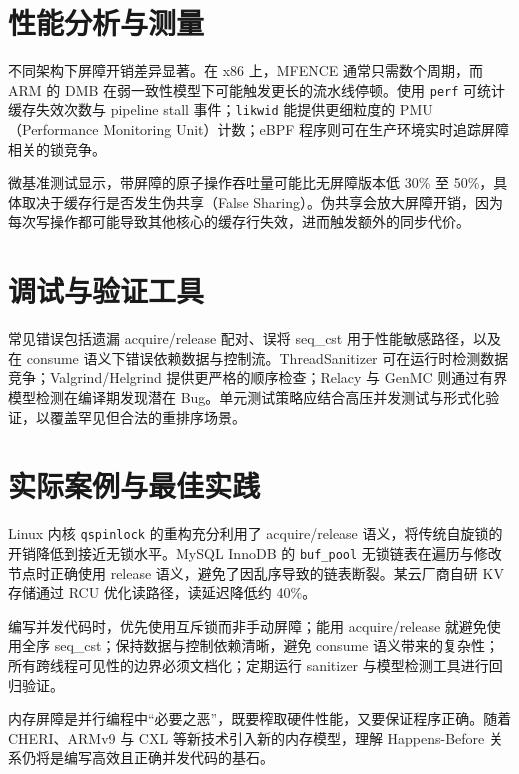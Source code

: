 \chapter{性能分析与测量}
不同架构下屏障开销差异显著。在 x86 上，MFENCE 通常只需数个周期，而 ARM 的 DMB 在弱一致性模型下可能触发更长的流水线停顿。使用 \texttt{perf} 可统计缓存失效次数与 pipeline stall 事件；\texttt{likwid} 能提供更细粒度的 PMU（Performance Monitoring Unit）计数；eBPF 程序则可在生产环境实时追踪屏障相关的锁竞争。\par
微基准测试显示，带屏障的原子操作吞吐量可能比无屏障版本低 30\%{} 至 50\%{}，具体取决于缓存行是否发生伪共享（False Sharing）。伪共享会放大屏障开销，因为每次写操作都可能导致其他核心的缓存行失效，进而触发额外的同步代价。\par
\chapter{调试与验证工具}
常见错误包括遗漏 acquire/release 配对、误将 seq\_{}cst 用于性能敏感路径，以及在 consume 语义下错误依赖数据与控制流。ThreadSanitizer 可在运行时检测数据竞争；Valgrind/Helgrind 提供更严格的顺序检查；Relacy 与 GenMC 则通过有界模型检测在编译期发现潜在 Bug。单元测试策略应结合高压并发测试与形式化验证，以覆盖罕见但合法的重排序场景。\par
\chapter{实际案例与最佳实践}
Linux 内核 \texttt{qspinlock} 的重构充分利用了 acquire/release 语义，将传统自旋锁的开销降低到接近无锁水平。MySQL InnoDB 的 \texttt{buf\_{}pool} 无锁链表在遍历与修改节点时正确使用 release 语义，避免了因乱序导致的链表断裂。某云厂商自研 KV 存储通过 RCU 优化读路径，读延迟降低约 40\%{}。\par
编写并发代码时，优先使用互斥锁而非手动屏障；能用 acquire/release 就避免使用全序 seq\_{}cst；保持数据与控制依赖清晰，避免 consume 语义带来的复杂性；所有跨线程可见性的边界必须文档化；定期运行 sanitizer 与模型检测工具进行回归验证。\par
内存屏障是并行编程中“必要之恶”，既要榨取硬件性能，又要保证程序正确。随着 CHERI、ARMv9 与 CXL 等新技术引入新的内存模型，理解 Happens-Before 关系仍将是编写高效且正确并发代码的基石。\par
